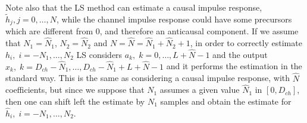 \documentclass[10pt]{article}
\begin{document}
Note also that the LS method can estimate a causal impulse response, $\tilde{h}_j, j = 0, \dots, N$, while the channel impulse response could have some precursors which are different from 0, and therefore an anticausal component. If we assume that $N_1 = \hat{N}_1$, $N_2 = \hat{N}_2$ and $N = \hat{N} = \hat{N}_1 + \hat{N}_2 + 1$, in order to correctly estimate $h_i, \; i = -N_1, \dots, N_2$ LS considers $a_k, \; k = 0, \dots, L+\hat{N}-1$ and the output $x_k, \; k = D_{ch} - \hat{N}_1, \dots, D_{ch} - \hat{N}_1 + L + \hat{N} - 1$ and it performs the estimation in the standard way. This is the same as considering a causal impulse response, with $\hat{N}$ coefficients, but since we suppose that $N_1$ assumes a given value $\hat{N}_1$ in $[0, D_{ch}]$, then one can shift left the estimate by $N_1$ samples and obtain the estimate for $\hat{h}_i, \; i = -N_1, \dots, N_2$. 
\end{document}
